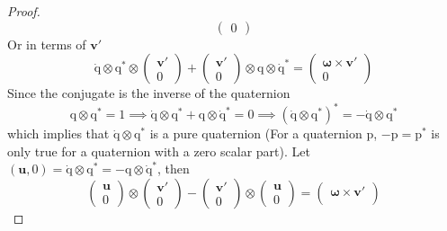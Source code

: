 \documentclass{amsart}
\theoremstyle{definition}
\theoremstyle{remark}
\numberwithin{equation}{section}
\begin{document}
\begin{proof}
\begin{equation}
\begin{pmatrix}
      0
    \end{pmatrix}
  \end{equation}
  Or in terms of $\mathbf{v}'$
  \begin{equation}
    \mathrm{\dot{q}}\otimes\mathrm{q^*}\otimes
    \begin{pmatrix}
      \mathbf{v}'\\
      0
    \end{pmatrix}
    +
    \begin{pmatrix}
      \mathbf{v}'\\
      0
    \end{pmatrix}
    \otimes \mathrm{q} \otimes \mathrm{\dot{q}^*} =
    \begin{pmatrix}
      \boldsymbol\omega\times\mathbf{v}' \\
      0
    \end{pmatrix}
  \end{equation}
  Since the conjugate is the inverse of the quaternion
  \begin{equation}
    \mathrm{q}\otimes\mathrm{q^*} = 1 \implies
    \mathrm{\dot{q}} \otimes\mathrm{q^*}+\mathrm{q}\otimes\mathrm{\dot{q}^*} = 0 \implies
    \left(\mathrm{\dot{q}}\otimes\mathrm{q}^*\right)^*=-\mathrm{\dot{q}}\otimes \mathrm{q^*}
  \end{equation}
  which implies that $\mathrm{\dot{q}}\otimes\mathrm{q}^*$ is a pure quaternion (For a quaternion $\mathrm{p}$, $-\mathrm{p}=\mathrm{p^*}$ is only true for a quaternion with a zero scalar part). Let $(\mathbf{u}, 0) = \mathrm{\dot{q}}\otimes\mathrm{q}^*=-\mathrm{q}\otimes\mathrm{\dot{q}^*}$, then
  \begin{equation}
    \begin{pmatrix}
      \mathbf{u} \\
      0
    \end{pmatrix}
    \otimes
    \begin{pmatrix}
      \mathbf{v}'\\
      0
    \end{pmatrix}
    -
    \begin{pmatrix}
      \mathbf{v}'\\
      0
    \end{pmatrix}
    \otimes
    \begin{pmatrix}
      \mathbf{u}\\
      0
    \end{pmatrix}
    =
    \begin{pmatrix}
      \boldsymbol\omega\times\mathbf{v}'\\

\end{pmatrix}
\end{equation}
\end{proof}
\end{document}
